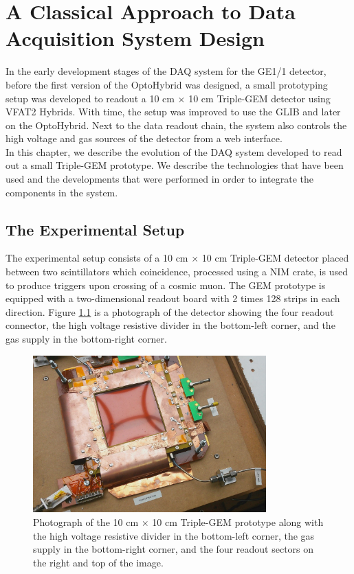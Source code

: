 \chapter{A Classical Approach to Data Acquisition System Design}
\label{chap:III-1-arch}

  In the early development stages of the DAQ system for the GE1/1 detector, before the first version of the OptoHybrid was designed, a small prototyping setup was developed to readout a 10 cm $ \times $ 10 cm Triple-GEM detector using VFAT2 Hybrids. With time, the setup was improved to use the GLIB and later on the OptoHybrid. Next to the data readout chain, the system also controls the high voltage and gas sources of the detector from a web interface. \\

  In this chapter, we describe the evolution of the DAQ system developed to read out a small Triple-GEM prototype. We describe the technologies that have been used and the developments that were performed in order to integrate the components in the system.

  \section{The Experimental Setup}

    The experimental setup consists of a 10 cm $ \times $ 10 cm Triple-GEM detector placed between two scintillators which coincidence, processed using a NIM crate, is used to produce triggers upon crossing of a cosmic muon. The GEM prototype is equipped with a two-dimensional readout board with 2 times 128 strips in each direction. Figure \ref{fig:III-1-gem} is a photograph of the detector showing the four readout connector, the high voltage resistive divider in the bottom-left corner, and the gas supply in the bottom-right corner. \\

    \begin{figure}[h!]
      \centering
      \includegraphics[width=0.8\textwidth]{img/III-1-arch/gem.png}
      \caption{Photograph of the 10 cm $ \times $ 10 cm Triple-GEM prototype along with the high voltage resistive divider in the bottom-left corner, the gas supply in the bottom-right corner, and the four readout sectors on the right and top of the image.}
      \label{fig:III-1-gem}
    \end{figure}

